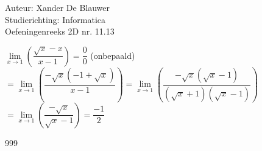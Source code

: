 \documentclass[a4paper]{article}
\begin{document}
\noindent \large Auteur: Xander De Blauwer \\
\noindent \large Studierichting: Informatica\\
\noindent \large Oefeningenreeks 2D nr. 11.13\\

\medskip

\normalsize

$\lim\limits_{x \rightarrow 1} \left(\dfrac{\sqrt{x}-x}{x-1}\right) = \dfrac{0}{0}$ (onbepaald) \\

$= \lim\limits_{x \rightarrow 1} \left(\dfrac{-\sqrt{x}(-1+\sqrt{x})}{x-1}\right) = \lim\limits_{x \rightarrow 1} \left(\dfrac{-\sqrt{x}(\sqrt{x}-1)}{(\sqrt{x}+1)(\sqrt{x}-1)}\right) $ \\

$= \lim\limits_{x \rightarrow 1} \left(\dfrac{-\sqrt{x}}{\sqrt{x}-1}\right) = \dfrac{-1}{2}$




\begin{thebibliography}{999}
\end{thebibliography}
\end{document}
